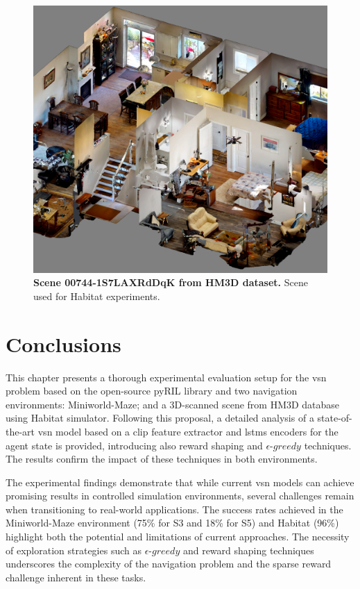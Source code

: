 \begin{figure}
    \centering
    \includegraphics[width=0.6\linewidth]{figures/understanding_vsn/dollhouse}
    \caption[Scene used for Habitat experiments]{\textbf{Scene 00744-1S7LAXRdDqK from HM3D dataset.} Scene used for Habitat experiments.}
    \label{fig:dollhouse}
\end{figure}


\section{Conclusions}
\label{sec:conclusions}

This chapter presents a thorough experimental evaluation setup for the \acrshort{vsn} problem based on the open-source pyRIL library and two navigation environments: Miniworld-Maze; and a 3D-scanned scene from HM3D database using Habitat simulator.
Following this proposal, a detailed analysis of a state-of-the-art \acrshort{vsn} model based on a \acrshort{clip} feature extractor and \acrshort{lstm}s encoders for the agent state is provided, introducing also reward shaping and $\epsilon\text{-}greedy$ techniques.
The results confirm the impact of these techniques in both environments.

The experimental findings demonstrate that while current \acrshort{vsn} models can achieve promising results in controlled simulation environments, several challenges remain when transitioning to real-world applications.
The success rates achieved in the Miniworld-Maze environment (75\% for S3 and 18\% for S5) and Habitat (96\%) highlight both the potential and limitations of current approaches.
The necessity of exploration strategies such as $\epsilon\text{-}greedy$ and reward shaping techniques underscores the complexity of the navigation problem and the sparse reward challenge inherent in these tasks.

